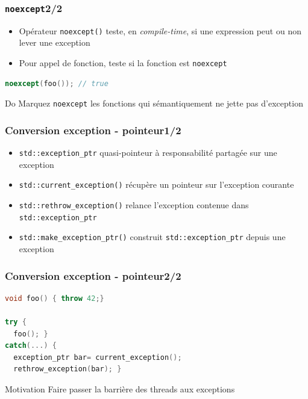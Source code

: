 \documentclass[C++.tex]{subfiles}
\begin{document}
\begin{frame}[fragile]
	\frametitle{\lstinline|noexcept|\titlehfill{}2/2}
	\begin{itemize}
		\item Opérateur \lstinline|noexcept()| teste, en \textit{compile-time}, si une expression peut ou non lever une exception
		\item Pour appel de fonction, teste si la fonction est \lstinline|noexcept|

	\end{itemize}

	\begin{lstlisting}[language=C++]
noexcept(foo()); // true\end{lstlisting}

	\begin{exampleblock}{Do}
		Marquez \lstinline|noexcept| les fonctions qui sémantiquement ne jette pas d'exception

	\end{exampleblock}
\end{frame}

\begin{frame}[fragile]
	\frametitle{Conversion exception - pointeur\titlehfill{}1/2}
	\begin{itemize}
		\item \lstinline|std::exception_ptr| quasi-pointeur à responsabilité partagée sur une exception
		\item \lstinline|std::current_exception()| récupère un pointeur sur l'exception courante
		\item \lstinline|std::rethrow_exception()| relance l'exception contenue dans \lstinline|std::exception_ptr| 
		\item \lstinline|std::make_exception_ptr()| construit \lstinline|std::exception_ptr| depuis une exception
	\end{itemize}
\end{frame}

\begin{frame}[fragile]
	\frametitle{Conversion exception - pointeur\titlehfill{}2/2}
	\begin{lstlisting}[language=C++]
void foo() { throw 42;}

try {
  foo(); }
catch(...) {
  exception_ptr bar= current_exception();
  rethrow_exception(bar); } \end{lstlisting}

	\begin{block}{Motivation}
		Faire passer la barrière des threads aux exceptions
	\end{block}
\end{frame}
\end{document}
